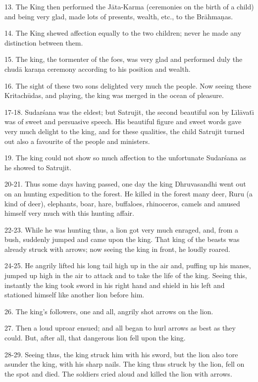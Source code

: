 13. The King then performed the J\=ata-Karma (ceremonies on the birth of a child) and being very glad, made lots of presents, wealth, etc., to the Br\=ahma\d{n}as.

14. The King shewed affection equally to the two children; never he made any distinction between them.

15. The king, the tormenter of the foes, was very glad and performed duly the chud\=a kara\d{n}a ceremony according to his position and wealth.

16. The sight of these two sons delighted very much the people. Now seeing these Kritach\=udas, and playing, the king was merged in the ocean of pleasure.

17-18. Sudar\'sana was the eldest; but Satrujit, the second beautiful son by L\={\i}l\=avat\={\i} was of sweet and persuasive speech. His beautiful figure and sweet words gave very much delight to the king, and for these qualities, the child Satrujit turned out also a favourite of the people and ministers.

19. The king could not show so much affection to the unfortunate Sudar\'sana as he showed to Satrujit.

20-21. Thus some days having passed, one day the king Dhruvasandhi went out on an hunting expedition to the forest. He killed in the forest many deer, Ruru (a kind of deer), elephants, boar, hare, buffaloes, rhinoceros, camels and amused himself very much with this hunting affair.

22-23. While he was hunting thus, a lion got very much enraged, and, from a bush, suddenly jumped and came upon the king. That king of the beasts was already struck with arrows; now seeing the king in front, he loudly roared.

24-25. He angrily lifted his long tail high up in the air and, puffing up his manes, jumped up high in the air to attack and to take the life of the king. Seeing this, instantly the king took sword in his right hand and shield in his left and stationed himself like another lion before him.

26. The king's followers, one and all, angrily shot arrows on the lion.

27. Then a loud uproar ensued; and all began to hurl arrows as best as they could. But, after all, that dangerous lion fell upon the king.

28-29. Seeing thus, the king struck him with his sword, but the lion also tore asunder the king, with his sharp nails. The king thus struck by the lion, fell on the spot and died. The soldiers cried aloud and killed the lion with arrows.


